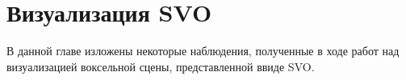 \chapter*{Визуализация SVO}

В данной главе изложены некоторые наблюдения, полученные в ходе работ над визуализацией воксельной сцены, представленной ввиде SVO.